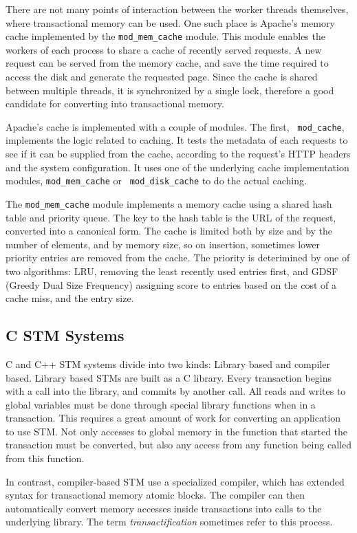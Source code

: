 \documentclass[preprint,11pt]{sigplanconf}
\let \cite = \citep
\begin{document}
There are not many points of interaction between the worker threads themselves,
where transactional memory can be used. One such place is Apache's memory cache
implemented by the {\tt mod\_mem\_cache} module. This module enables the workers
of each process to share a cache of recently served requests. A new request can
be served from the memory cache, and save the time required to access the disk
and generate the requested page. Since the cache is shared between multiple
threads, it is synchronized by a single lock, therefore a good candidate for
converting into transactional memory.

Apache's cache is implemented with a couple of modules. The first, {\tt
mod\_cache}, implements the logic related to caching. It tests the metadata of
each requests to see if it can be supplied from the cache, according to the
request's HTTP headers and the system configuration. It uses one of the
underlying cache implementation modules, {\tt mod\_mem\_cache} or {\tt
mod\_disk\_cache} to do the actual caching.

The {\tt mod\_mem\_cache} module implements a memory cache using a shared hash
table and priority queue. The key to the hash table is the URL of the request,
converted into a canonical form. The cache is limited both by size and by the
number of elements, and by memory size, so on insertion, sometimes lower
priority entries are removed from the cache. The priority is deterimined by one
of two algorithms: LRU, removing the least recently used entries first, and GDSF
(Greedy Dual Size Frequency) assigning score to entries based on the cost of a
cache miss, and the entry size.

\subsection{C STM Systems}
C and C++ STM systems divide into two kinds: Library based and compiler based.
Library based STMs \cite{TL2,felber2008tinystm,RSTM} are built as a C library.
Every transaction begins with a call into the library, and commits by another
call. All reads and writes to global variables must be done through special
library functions when in a transaction. This requires a great amount of work
for converting an application to use STM. Not only accesses to global memory in
the function that started the transaction must be converted, but also any access
from any function being called from this function. 

In contrast, compiler-based STM
\cite{felber2007tanger,icc,gcctm,baek:opentm:pact:2007} use a specialized
compiler, which has extended syntax for transactional memory atomic blocks. The
compiler can then automatically convert memory accesses inside transactions
into calls to the underlying library. The term \emph{transactification}
sometimes refer to this process.
\end{document}
